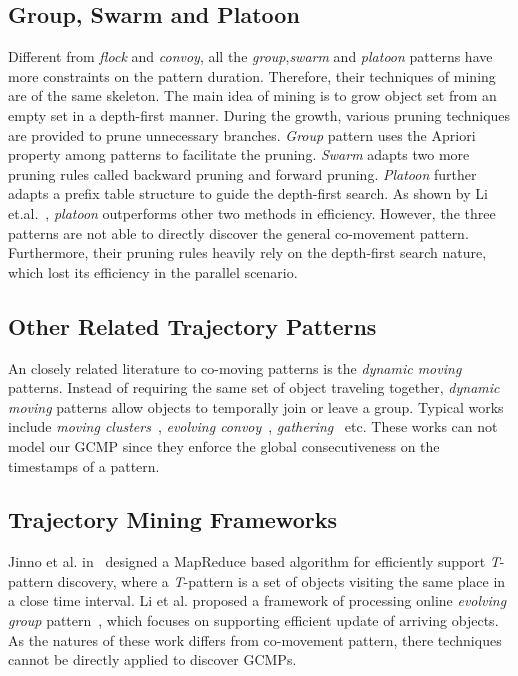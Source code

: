 \subsection{Group, Swarm and Platoon}
Different from \emph{flock} and \emph{convoy}, all the \emph{group},\emph{swarm} and \emph{platoon}
patterns have more constraints on the pattern duration. Therefore, their techniques of mining are of
the same skeleton. The main idea of mining is to grow object set from an empty set
in a depth-first manner. During the growth, various pruning techniques are provided to prune 
unnecessary branches. \emph{Group} pattern uses the Apriori property among patterns to facilitate the pruning.
\emph{Swarm} adapts two more pruning rules called backward pruning and forward pruning. \emph{Platoon}
further adapts a prefix table structure to guide the depth-first search. As shown by Li et.al.~\cite{li2015platoon},
\emph{platoon} outperforms other two methods in efficiency. 
However, the three patterns are not able to directly discover the general co-movement pattern.
Furthermore, their pruning rules heavily rely on the depth-first search nature, which lost its efficiency
in the parallel scenario.

\subsection{Other Related Trajectory Patterns}
An closely related literature to co-moving patterns is the \emph{dynamic moving} patterns. Instead of requiring the same set of object traveling together, \emph{dynamic moving} patterns allow objects to temporally join or leave a group. Typical works include \emph{moving clusters}~\cite{kalnis2005movingclusters}, \emph{evolving convoy}~\cite{aung2010discovery}, \emph{gathering}~\cite{zheng2013gathering} etc. These works can not model our GCMP since they enforce the global consecutiveness on the timestamps of a pattern. 
\subsection{Trajectory Mining Frameworks}
Jinno et al. in~\cite{jinno2012paralleltpattern} designed a MapReduce based algorithm for efficiently support \emph{T}-pattern discovery, where a \emph{T}-pattern is a set of objects visiting the same place in a close time interval. Li et al. proposed a framework of processing online \emph{evolving group} pattern~\cite{li2013onlinegroup}, which focuses on supporting efficient update of arriving objects. 
As the natures of these work differs from co-movement pattern, there techniques cannot be directly applied to discover GCMPs.
